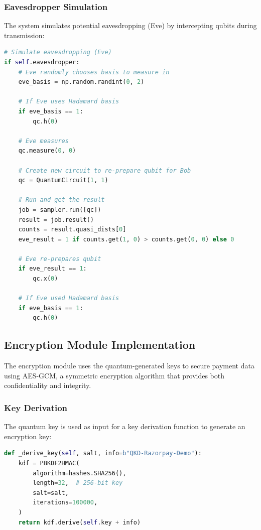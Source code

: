 \documentclass[onecolumn,a4paper,10pt]{IEEEtran}
\begin{document}
\subsubsection{Eavesdropper Simulation}
The system simulates potential eavesdropping (Eve) by intercepting qubits during transmission:

\begin{lstlisting}[language=Python, caption=Eavesdropper Simulation]
# Simulate eavesdropping (Eve)
if self.eavesdropper:
    # Eve randomly chooses basis to measure in
    eve_basis = np.random.randint(0, 2)
    
    # If Eve uses Hadamard basis
    if eve_basis == 1:
        qc.h(0)
    
    # Eve measures
    qc.measure(0, 0)
    
    # Create new circuit to re-prepare qubit for Bob
    qc = QuantumCircuit(1, 1)
    
    # Run and get the result
    job = sampler.run([qc])
    result = job.result()
    counts = result.quasi_dists[0]
    eve_result = 1 if counts.get(1, 0) > counts.get(0, 0) else 0
    
    # Eve re-prepares qubit
    if eve_result == 1:
        qc.x(0)
    
    # If Eve used Hadamard basis
    if eve_basis == 1:
        qc.h(0)
\end{lstlisting}

\subsection{Encryption Module Implementation}
The encryption module uses the quantum-generated keys to secure payment data using AES-GCM, a symmetric encryption algorithm that provides both confidentiality and integrity.

\subsubsection{Key Derivation}
The quantum key is used as input for a key derivation function to generate an encryption key:

\begin{lstlisting}[language=Python, caption=Key Derivation from Quantum Key]
def _derive_key(self, salt, info=b"QKD-Razorpay-Demo"):
    kdf = PBKDF2HMAC(
        algorithm=hashes.SHA256(),
        length=32,  # 256-bit key
        salt=salt,
        iterations=100000,
    )
    return kdf.derive(self.key + info)
\end{lstlisting}
\end{document}
